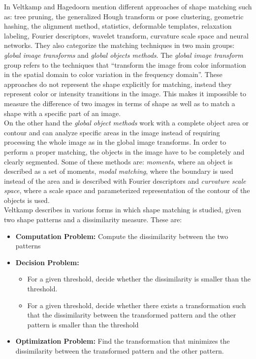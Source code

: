 In \cite{matchingbook} Veltkamp and Hagedoorn mention different 
approaches of shape matching such as: tree pruning, the
generalized Hough transform or pose clustering, geometric hashing,
the alignment method, statistics, deformable templates, relaxation
labeling, Fourier descriptors, wavelet transform, curvature
scale space and neural networks.
They also categorize the matching techniques in two main groups:
\emph{global image transforms} and \emph{global objects methods}.
The \emph{global image transform} group refers to the techniques that
``transform the image from color information in the spatial
domain to color variation in the frequency domain''. 
These approaches do not represent the shape explicitly for 
matching, instead they represent color or intensity transitions 
in the image. This makes it impossible to measure the difference of 
two images in terms of shape as well as to match a shape with a 
specific part of an image.\\
On the other hand the \emph{global object methods} work with a complete
object area or contour and can analyze specific areas in the 
image instead of requiring processing the whole image as in 
the global image transforms. In order to perform a proper
matching, the objects in the image have to be completely and
clearly segmented. Some of these methods are: \emph{moments}, where an
object is described as a set of moments, \emph{modal matching},
where the boundary is used instead of the area and is described 
with Fourier descriptors and \emph{curvature scale space}, where a
scale space and parameterized representation of the contour of the 
objects is used.\\

Veltkamp describes in \cite{matching2} various forms in
which shape matching is studied, given two shape patterns
and a dissimilarity measure. These are:

\begin{itemize}
\item \textbf{Computation Problem: }Compute the dissimilarity
  between the two patterns
\item \textbf{Decision Problem: }
  \begin{itemize}
  \item  For a given threshold, decide
  whether the dissimilarity is smaller than the threshold.
  \item For a given threshold, decide
    whether there exists a transformation such that the
    dissimilarity between the transformed pattern and the other 
    pattern is smaller than the threshold
  \end{itemize}
 
\item \textbf{Optimization Problem: }Find the transformation
that minimizes the dissimilarity between the transformed
pattern and the other pattern.
\end{itemize}

